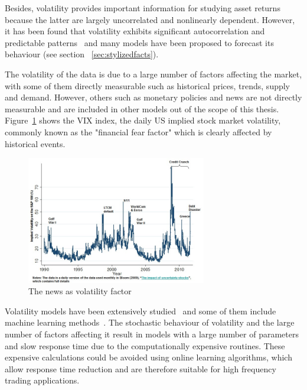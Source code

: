 Besides, volatility provides important information for studying asset returns because the latter are largely uncorrelated and nonlinearly dependent. However, it has been found that volatility exhibits significant autocorrelation and predictable patterns~\cite{poon+granger2003} and  many models have been proposed to forecast its behaviour (see section ~\ref{sec:stylizedfacts}).

The volatility of the data is due to a large number of factors affecting the market, with some of them directly measurable such as historical prices, trends, supply and demand. However, others such as monetary policies and news are not directly measurable and are included in other models out of the scope of this thesis. Figure~\ref{fig:VolFactorNews} shows the VIX index, the daily US implied stock market volatility, commonly known as the "financial fear factor" which is clearly affected by historical events.


\begin{figure}[h]
 \centering
 \includegraphics[width=0.7\textwidth]{img/vol-factor-thenews.jpg}
 \caption{The news as volatility factor}
 \label{fig:VolFactorNews}
\end{figure}


Volatility models have been extensively studied~\cite{gatheral2006,poon+granger2003,knight2002} and some of  them include machine learning methods~\cite{hamidetal2004,donaldsonetal1997,shiyietal2008,shiyietal2010,gavrishchaka2006,vasilios2012}.  
The stochastic behaviour of volatility and the large number of factors affecting it result in models with a large number of parameters and slow response time due to the computationally expensive routines. These expensive calculations could be avoided using online learning algorithms, which allow response time reduction and are therefore suitable for high frequency trading applications. 

